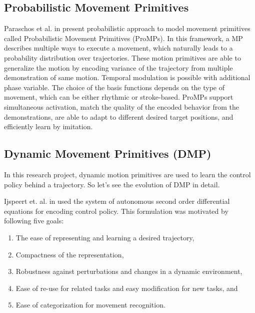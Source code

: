 \subsection{Probabilistic Movement Primitives}

Paraschos et al. in \cite{paraschos2013probabilistic} present probabilistic approach to model movement primitives called Probabilistic Movement Primitives (ProMPs). In this framework, a MP describes multiple ways to execute a movement, which naturally leads to a probability distribution over trajectories. These motion primitives are able to generalize the motion by encoding variance of the trajectory from multiple demonstration of same motion. Temporal modulation is possible with additional phase variable. The choice of the basis functions depends on the type of movement, which can be either rhythmic or stroke-based. ProMPs support simultaneous activation, match the quality of the encoded behavior from the demonstrations, are able to adapt to different desired target positions, and efficiently learn by imitation. 



\subsection{Dynamic Movement Primitives (DMP)}
In this research project, dynamic motion primitives are used to learn the control policy behind a trajectory. So let's see the evolution of DMP in detail. 

Ijspeert et. al. in \cite{ijspeert2002movement} used the system of autonomous second order differential equations for encoding control policy. This formulation was motivated by following five goals:
\begin{enumerate}
	\item The ease of representing and learning a desired trajectory, 
	\item Compactness of the representation, 
	\item Robustness against perturbations and changes in a dynamic environment, 
	\item Ease of re-use for related tasks and easy modification for new tasks, and 
	\item Ease of categorization for movement recognition.
\end{enumerate}

